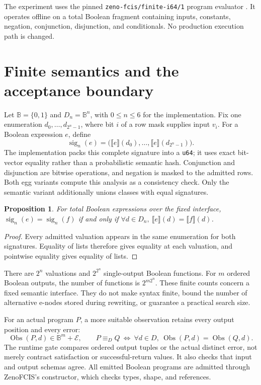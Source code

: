 \documentclass[11pt]{article}
\newtheorem{proposition}{Proposition}
\newcommand{\Bool}{\mathbb{B}}
\newcommand{\obs}{\operatorname{Obs}}
\newcommand{\sig}{\operatorname{sig}}
\begin{document}
The experiment uses the pinned \texttt{zeno-fcis/finite-i64/1} program evaluator
\cite{fcis}. It operates offline on a total Boolean fragment containing inputs,
constants, negation, conjunction, disjunction, and conditionals.
No production execution path is changed.

\section{Finite semantics and the acceptance boundary}

Let $\Bool=\{0,1\}$ and $D_n=\Bool^n$, with $0\le n\le6$ for the
implementation. Fix one enumeration $d_0,\ldots,d_{2^n-1}$, where bit $i$ of a
row mask supplies input $v_i$. For a Boolean expression $e$, define
\[
  \sig_n(e)=
    \bigl(\llbracket e\rrbracket(d_0),\ldots,
           \llbracket e\rrbracket(d_{2^n-1})\bigr).
\]
The implementation packs this complete signature into a \texttt{u64};
it uses exact bit-vector equality rather than a probabilistic semantic hash.
Conjunction and disjunction are bitwise operations, and negation is masked to
the admitted rows. Both egg variants compute this analysis as a consistency
check. Only the semantic variant additionally unions classes with equal
signatures.

\begin{proposition}
For total Boolean expressions over the fixed interface,
$\sig_n(e)=\sig_n(f)$ if and only if
$\forall d\in D_n,\ \llbracket e\rrbracket(d)=\llbracket f\rrbracket(d)$.
\end{proposition}
\begin{proof}
Every admitted valuation appears in the same enumeration for both signatures.
Equality of lists therefore gives equality at each valuation, and pointwise
equality gives equality of lists.
\end{proof}

There are $2^n$ valuations and $2^{2^n}$ single-output Boolean functions.
For $m$ ordered Boolean outputs, the number of functions is $2^{m2^n}$.
These finite counts concern a fixed semantic interface. They do not make syntax
finite, bound the number of alternative e-nodes stored during rewriting, or
guarantee a practical search size.

For an actual program $P$, a more suitable observation retains every output
position and every error:
\[
  \obs(P,d)\in \Bool^m+\mathcal E,\qquad
  P\equiv_D Q\ \Longleftrightarrow\
  \forall d\in D,\ \obs(P,d)=\obs(Q,d).
\]
The runtime gate compares ordered output tuples or the actual distinct error,
not merely contract satisfaction or successful-return values. It also checks
that input and output schemas agree. All emitted Boolean programs are admitted
through ZenoFCIS's constructor, which checks types, shape, and references.
\end{document}
